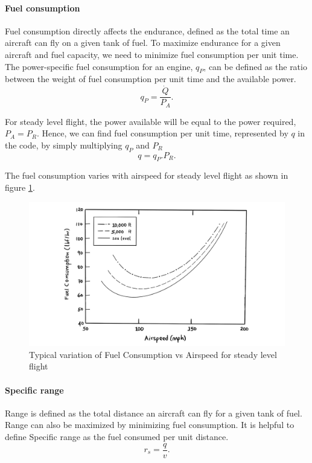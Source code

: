 \documentclass[letterpaper,12pt]{article}
\begin{document}
\paragraph{Fuel consumption}
Fuel consumption directly affects the endurance, defined as the total time an aircraft can fly on a given tank of fuel. To maximize endurance for a given aircraft and fuel capacity, we need to minimize fuel consumption per unit time. The power-specific fuel consumption for an engine, $q_P$, can be defined as the ratio between the weight of fuel consumption per unit time and the available power.
\begin{equation}
q_P=\frac{\dot Q}{P_A}.
\end{equation}

For steady level flight, the power available will be equal to the power required, $P_A=P_R$. Hence, we can find fuel consumption per unit time, represented by $q$ in the code, by simply multiplying $q_P$ and $P_R$
\begin{equation}
\boxed{
q=q_P . P_R.
}
\label{fuelc}
\end{equation}

The fuel consumption varies with airspeed for steady level flight as shown in figure \ref{FCvsV}.
\begin{figure}[H]
\includegraphics[scale=0.3]{plot_fuel}
\centering
\caption{Typical variation of Fuel Consumption vs Airspeed for steady level flight}
\label{FCvsV}
\end{figure}

\paragraph{Specific range}
Range is defined as the total distance an aircraft can fly for a given tank of fuel. Range can also be maximized by minimizing fuel consumption. It is helpful to define Specific range as the fuel consumed per unit distance. 
\begin{equation}
\boxed{
r_s = \frac{q}{v}.
}
\label{sr}
\end{equation}
\end{document}
